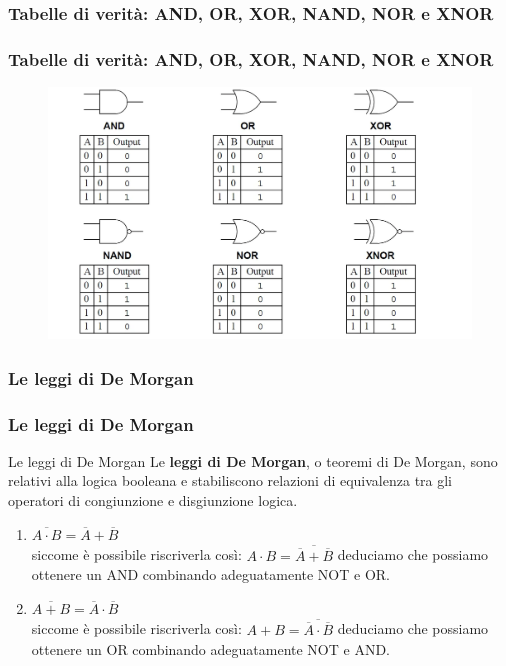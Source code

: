 \subsubsection[Tabelle di verità: AND, OR, XOR, NAND, NOR e XNOR]{Tabelle di verità: AND, OR, XOR, NAND, NOR e XNOR}
\begin{frame}
	\frametitle{Tabelle di verità: AND, OR, XOR, NAND, NOR e XNOR}

	\begin{figure}[!htbp]
		\centering 
		\includegraphics[width=1.0\linewidth]{images/2_le_architetture/logic_gates_truthtables.png}
	\end{figure}
	
\end{frame}


\subsubsection[Le leggi di De Morgan]{Le leggi di De Morgan}
\begin{frame}
	\frametitle{Le leggi di De Morgan}

	\begin{block}{Le leggi di De Morgan}
		Le \textbf{leggi di De Morgan}, o teoremi di De Morgan, sono relativi alla logica booleana e stabiliscono relazioni di equivalenza tra gli operatori di congiunzione e disgiunzione logica.\\ \vspace{0.8em}
		
		\begin{enumerate}
			\item $\overline{A \cdot B} = \overline A + \overline B$\\
			siccome è possibile riscriverla così: $A \cdot B = \overline{\overline A + \overline B}$ deduciamo che possiamo ottenere un AND combinando adeguatamente NOT e OR.
			\item $\overline{A + B} = \overline {A} \cdot \overline {B}$	\\
			siccome è possibile riscriverla così: $A + B = \overline{\overline {A} \cdot \overline {B}}$
			deduciamo che possiamo ottenere un OR combinando adeguatamente NOT e AND.
		\end{enumerate}
		
	\end{block}
	
\end{frame}


